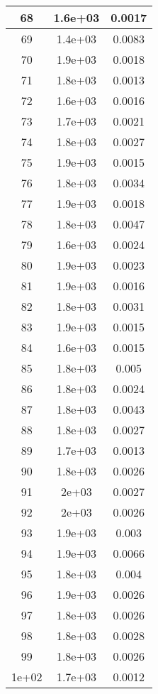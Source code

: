\begin{tabularx}{0.45\textwidth}{c|c|c}
68 & 1.6e+03 & 0.0017\\ \hline
69 & 1.4e+03 & 0.0083\\ \hline
70 & 1.9e+03 & 0.0018\\ \hline
71 & 1.8e+03 & 0.0013\\ \hline
72 & 1.6e+03 & 0.0016\\ \hline
73 & 1.7e+03 & 0.0021\\ \hline
74 & 1.8e+03 & 0.0027\\ \hline
75 & 1.9e+03 & 0.0015\\ \hline
76 & 1.8e+03 & 0.0034\\ \hline
77 & 1.9e+03 & 0.0018\\ \hline
78 & 1.8e+03 & 0.0047\\ \hline
79 & 1.6e+03 & 0.0024\\ \hline
80 & 1.9e+03 & 0.0023\\ \hline
81 & 1.9e+03 & 0.0016\\ \hline
82 & 1.8e+03 & 0.0031\\ \hline
83 & 1.9e+03 & 0.0015\\ \hline
84 & 1.6e+03 & 0.0015\\ \hline
85 & 1.8e+03 & 0.005\\ \hline
86 & 1.8e+03 & 0.0024\\ \hline
87 & 1.8e+03 & 0.0043\\ \hline
88 & 1.8e+03 & 0.0027\\ \hline
89 & 1.7e+03 & 0.0013\\ \hline
90 & 1.8e+03 & 0.0026\\ \hline
91 & 2e+03 & 0.0027\\ \hline
92 & 2e+03 & 0.0026\\ \hline
93 & 1.9e+03 & 0.003\\ \hline
94 & 1.9e+03 & 0.0066\\ \hline
95 & 1.8e+03 & 0.004\\ \hline
96 & 1.9e+03 & 0.0026\\ \hline
97 & 1.8e+03 & 0.0026\\ \hline
98 & 1.8e+03 & 0.0028\\ \hline
99 & 1.8e+03 & 0.0026\\ \hline
1e+02 & 1.7e+03 & 0.0012\\
\end{tabularx}